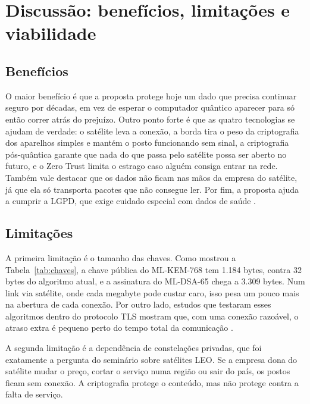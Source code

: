 \documentclass[12pt,a4paper]{article}
\begin{document}
\section{Discussão: benefícios, limitações e viabilidade}

\subsection{Benefícios}

O maior benefício é que a proposta protege hoje um dado que precisa continuar seguro por décadas, em vez de esperar o computador quântico aparecer para só então correr atrás do prejuízo. Outro ponto forte é que as quatro tecnologias se ajudam de verdade: o satélite leva a conexão, a borda tira o peso da criptografia dos aparelhos simples e mantém o posto funcionando sem sinal, a criptografia pós-quântica garante que nada do que passa pelo satélite possa ser aberto no futuro, e o Zero Trust limita o estrago caso alguém consiga entrar na rede. Também vale destacar que os dados não ficam nas mãos da empresa do satélite, já que ela só transporta pacotes que não consegue ler. Por fim, a proposta ajuda a cumprir a LGPD, que exige cuidado especial com dados de saúde \cite{brasil2018lgpd}.

\subsection{Limitações}

A primeira limitação é o tamanho das chaves. Como mostrou a Tabela~\ref{tab:chaves}, a chave pública do ML-KEM-768 tem 1.184 bytes, contra 32 bytes do algoritmo atual, e a assinatura do ML-DSA-65 chega a 3.309 bytes. Num link via satélite, onde cada megabyte pode custar caro, isso pesa um pouco mais na abertura de cada conexão. Por outro lado, estudos que testaram esses algoritmos dentro do protocolo TLS mostram que, com uma conexão razoável, o atraso extra é pequeno perto do tempo total da comunicação \cite{paquin2020benchmarking}.

A segunda limitação é a dependência de constelações privadas, que foi exatamente a pergunta do seminário sobre satélites LEO. Se a empresa dona do satélite mudar o preço, cortar o serviço numa região ou sair do país, os postos ficam sem conexão. A criptografia protege o conteúdo, mas não protege contra a falta de serviço.
\end{document}
